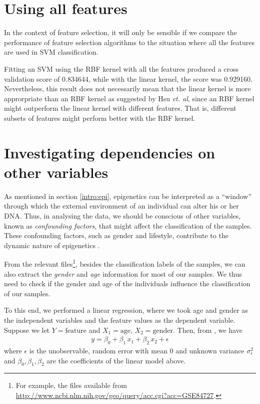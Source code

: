 \documentclass[12pt, twoside, a4paper]{report}
\begin{document}
\section{Using all features} \label{data:all_features}

In the context of feature selection, it will only be sensible if we compare the performance of feature selection algorithms to the situation where all the features are used in SVM classification.


Fitting an SVM using the RBF kernel with all the features produced a cross validation score of 0.834644, while with the linear kernel, the score was 0.929160. Nevertheless, this result does not necessarily mean that the linear kernel is more approrpriate than an RBF kernel as suggested by Hsu \textit{et. al}, since an RBF kernel might outperform the linear kernel with different features. That is, different subsets of features might perform better with the RBF kernel.

\section{Investigating dependencies on other variables}

As mentioned in section \ref{intro:epi}, epigenetics can be interpreted as a ``window'' through which the external environment of an individual can alter his or her DNA. Thus, in analysing the data, we should be conscious of other variables, known as \textit{confounding factors}, that might affect the classification of the samples. These confounding factors, such as gender and lifestyle, contribute to the dynamic nature of epigenetics \cite{RefWorks:78}.

From the relevant files\footnote{For example, the files available from \url{http://www.ncbi.nlm.nih.gov/geo/query/acc.cgi?acc=GSE84727}.}, besides the classification labels of the samples, we can also extract the \textit{gender} and \textit{age} information for most of our samples. We thus need to check if the gender and age of the individuals influence the classification of our samples.

To this end, we performed a linear regression, where we took age and gender as the independent variables and the feature values as the dependent variable. Suppose we let $Y=\text{feature}$ and $X_1=\text{age}$, $X_2=\text{gender}$. Then, from \cite{RefWorks:219}, we have
\begin{align*}
y = \beta_0 + \beta_1 \, x_1 + \beta_2 \, x_2 + \epsilon
\end{align*}
where $\epsilon$ is the unobservable, random error with mean 0 and unknown variance $\sigma_\epsilon^2$ and $\beta_0, \beta_1, \beta_2$ are the coefficients of the linear model above.
\end{document}
